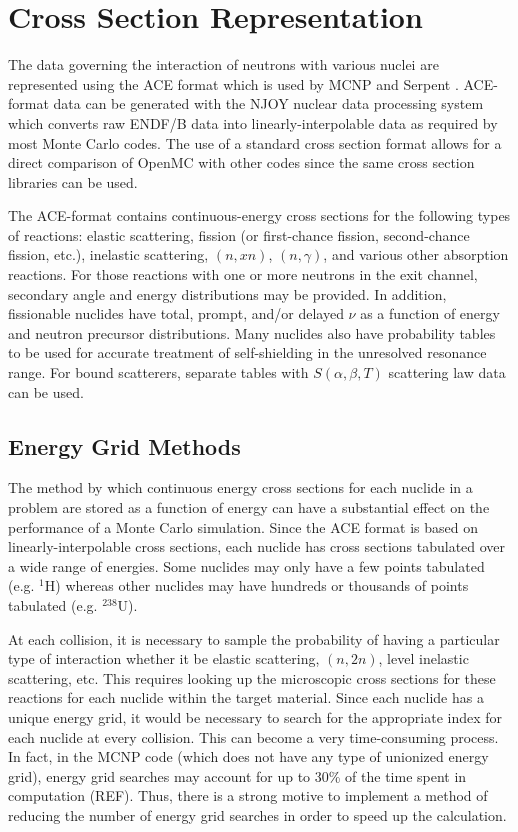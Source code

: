 \section{Cross Section Representation}

The data governing the interaction of neutrons with various nuclei are
represented using the ACE format \cite{lanl-x5-2008-ace} which is used by MCNP
\cite{lanl-x5-2008} and Serpent \cite{vtt-leppanen-2007}. ACE-format data can be
generated with the NJOY nuclear data processing system
\cite{nds-macfarlane-2010} which converts raw ENDF/B data
\cite{nds-chadwick-2011} into linearly-interpolable data as required by most
Monte Carlo codes. The use of a standard cross section format allows for a
direct comparison of OpenMC with other codes since the same cross section
libraries can be used.

The ACE-format contains continuous-energy cross sections for the following types
of reactions: elastic scattering, fission (or first-chance fission,
second-chance fission, etc.), inelastic scattering, $(n,xn)$, $(n,\gamma)$, and
various other absorption reactions. For those reactions with one or more
neutrons in the exit channel, secondary angle and energy distributions may be
provided. In addition, fissionable nuclides have total, prompt, and/or delayed
$\nu$ as a function of energy and neutron precursor distributions. Many nuclides
also have probability tables to be used for accurate treatment of self-shielding
in the unresolved resonance range. For bound scatterers, separate tables with
$S(\alpha,\beta,T)$ scattering law data can be used.

\subsection{Energy Grid Methods}

The method by which continuous energy cross sections for each nuclide in a
problem are stored as a function of energy can have a substantial effect on the
performance of a Monte Carlo simulation. Since the ACE format is based on
linearly-interpolable cross sections, each nuclide has cross sections tabulated
over a wide range of energies. Some nuclides may only have a few points
tabulated (e.g. $^1$H) whereas other nuclides may have hundreds or thousands of
points tabulated (e.g. $^{238}$U).

At each collision, it is necessary to sample the probability of having a
particular type of interaction whether it be elastic scattering, $(n,2n)$, level
inelastic scattering, etc. This requires looking up the microscopic cross
sections for these reactions for each nuclide within the target material. Since
each nuclide has a unique energy grid, it would be necessary to search for the
appropriate index for each nuclide at every collision. This can become a very
time-consuming process. In fact, in the MCNP code (which does not have any type
of unionized energy grid), energy grid searches may account for up to 30\% of
the time spent in computation (REF). Thus, there is a strong motive to implement
a method of reducing the number of energy grid searches in order to speed up the
calculation.

